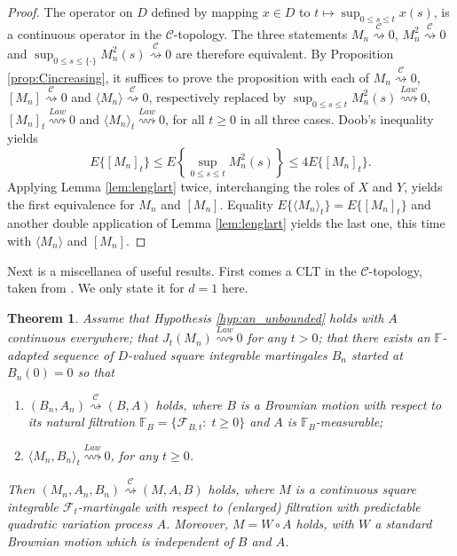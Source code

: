 \documentclass[final]{amsart}
\newtheorem{thm}{Theorem}[section]
\theoremstyle{definition}
\numberwithin{equation}{section}
\def\crochet#1{\langle #1 \rangle}
\newcommand{\dF}{\ensuremath{\mathbb{F}}}
\newcommand{\cF}{\ensuremath{\mathcal{F}}}
\begin{document}
\begin{proof} The operator on $D$ defined by mapping $x\in D$ to $t\mapsto\sup_{0\le s\le t}x(s)$,
is a continuous operator in the $\mathcal{C}$-topology. The three statements
$M_n \stackrel{\mathcal{C}}{\rightsquigarrow} 0$, $M_n^2 \stackrel{\mathcal{C}}{\rightsquigarrow} 0$ and
$\sup_{0\le s\le\{\cdot\}}M_n^2(s) \stackrel{\mathcal{C}}{\rightsquigarrow} 0$ are therefore equivalent.
By Proposition \ref{prop:Cincreasing}, it suffices to prove the proposition with each of
$M_n \stackrel{\mathcal{C}}{\rightsquigarrow} 0$,
 $[M_n] \stackrel{\mathcal{C}}{\rightsquigarrow} 0$ and
$\crochet{ M_n } \stackrel{\mathcal{C}}{\rightsquigarrow} 0$,
respectively replaced by $\sup_{0\le s\le t}M_n^2(s) \stackrel{Law}{\rightsquigarrow}0$,
$[M_n]_t\stackrel{Law}{\rightsquigarrow}0$ and
$\crochet{ M_n }_t\stackrel{Law}{\rightsquigarrow}0$, for all $t\ge0$ in all three cases.
Doob's inequality yields
$$
E\{[M_n]_t\} \le E\left\{\sup_{0\le s\le t}M_n^2(s)\right\}\le 4E\{[M_n]_t\}.
$$
Applying Lemma \ref{lem:lenglart} twice, interchanging the roles of $X$ and $Y$, yields the first equivalence for $M_n$ and $[M_n]$.
Equality $E\{\crochet{ M_n }_t\} = E\{[M_n]_t\}$ and another double application of Lemma \ref{lem:lenglart} yields the last one,
this time with $\crochet{ M_n }$ and $[M_n]$.
\end{proof}
Next is a miscellanea of useful results. First comes a CLT in the $\mathcal{C}$-topology,
taken from \citet[Theorem 2.1]{Remillard/Vaillancourt:2024a}. We only state it for $d=1$ here.

\begin{thm}\label{thm:jumps_vanish}
Assume that Hypothesis \ref{hyp:an_unbounded} holds with $A$ continuous everywhere; that
$J_t(M_n) \stackrel{Law}{\rightsquigarrow} 0$ for any $t>0$; that there exists an
$\dF$-adapted sequence of $D$-valued square integrable martingales $B_n$ started at $B_n(0)=0$ so that
\begin{enumerate}
\item $(B_n, A_n) \stackrel{\mathcal{C}}{\rightsquigarrow} (B,A)$ holds, where $B$ is a Brownian motion
with respect to its natural filtration $\dF_B = \{\cF_{B,t}: \; t\ge 0\}$ and $A$ is $\dF_B$-measurable;
\item  $\langle M_n, B_n\rangle_t \stackrel{Law}{\rightsquigarrow} 0$, for any $t\ge 0$.
\end{enumerate}
Then $(M_n, A_n,B_n) \stackrel{\mathcal{C}}{\rightsquigarrow} (M,A,B)$ holds,
where $M$ is a continuous square integrable ${\cF}_{t}$-martingale with respect to (enlarged) filtration
with predictable quadratic variation process $A$.
Moreover, $M = W\circ A$ holds, with $W$ a standard Brownian motion which is independent of $B$ and $A$.

\end{thm}
\end{document}
